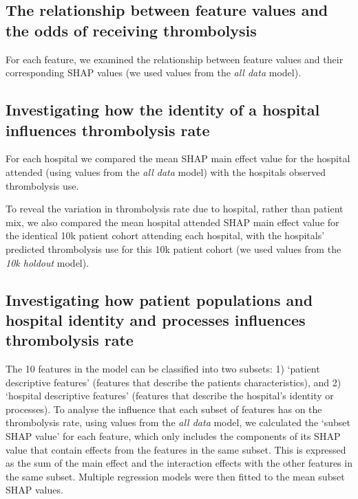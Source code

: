 \subsection{The relationship between feature values and the odds of receiving thrombolysis}

For each feature, we examined the relationship between feature values and their corresponding SHAP values (we used values from the \emph{all data} model).

\subsection{Investigating how the identity of a hospital influences thrombolysis rate}

For each hospital we compared the mean SHAP main effect value for the hospital attended (using values from the \emph{all data} model) with the hospitals observed thrombolysis use.

To reveal the variation in thrombolysis rate due to hospital, rather than patient mix, we also compared the mean hospital attended SHAP main effect value for the identical 10k patient cohort attending each hospital, with the hospitals' predicted thrombolysis use for this 10k patient cohort (we used values from the \emph{10k holdout} model).


\subsection{Investigating how patient populations and hospital identity and processes influences thrombolysis rate}

The 10 features in the model can be classified into two subsets: 1) `patient descriptive features' (features that describe the patients characteristics), and 2) `hospital descriptive features' (features that describe the hospital’s identity or processes). To analyse the influence that each subset of features has on the thrombolysis rate, using values from the \emph{all data} model, we calculated the `subset SHAP value' for each feature, which only includes the components of its SHAP value that contain effects from the features in the same subset. This is expressed as the sum of the main effect and the interaction effects with the other features in the same subset. Multiple regression models were then fitted to the mean subset SHAP values.

